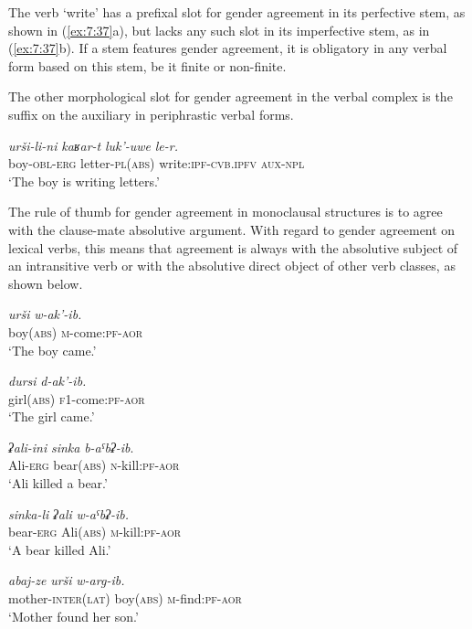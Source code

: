 ﻿\documentclass[output=paper]{langsci/langscibook}
\begin{document}
The verb `write' has a prefixal slot for gender agreement in its
perfective stem, as shown in (\ref{ex:7:37}a), but lacks any such slot in its
imperfective stem, as in (\ref{ex:7:37}b). If a stem features gender agreement, it
is obligatory in any verbal form based on this stem, be it finite or
non-finite.

The other morphological slot for gender agreement in the verbal complex
is the suffix on the auxiliary in periphrastic verbal forms.

\ea %
\gll \emph{urši-li-ni} \emph{kaʁar-t} \emph{luk'-uwe} \emph{le-r.}\\
boy-\textsc{obl}-\textsc{erg} letter-\textsc{pl}(\textsc{abs}) write:\textsc{ipf}-\textsc{cvb.ipfv} \textsc{aux}-\textsc{npl}\\
\glt `The boy is writing letters.'
\z
 
The rule of thumb for gender agreement in monoclausal structures is to
agree with the clause-mate absolutive argument. With regard to gender
agreement on lexical verbs, this means that agreement is always with the
absolutive subject of an intransitive verb or with the absolutive direct
object of other verb classes,
as shown below.

\ea %
\ea %
\gll \emph{urši} \emph{w-ak'-ib.}\\
boy(\textsc{abs}) \textsc{m}-come:\textsc{pf}-\textsc{aor}\\
\glt `The boy came.'

\ex %
\gll \emph{dursi} \emph{d-ak'-ib.}\\
girl(\textsc{abs}) \textsc{f1}-come:\textsc{pf}-\textsc{aor}\\
\glt `The girl came.'
\z

\ex %
\ea %
\gll \emph{ʡali-ini} \emph{sinka} \emph{b-aˤbʡ-ib}.\\
Ali-\textsc{erg} bear(\textsc{abs}) \textsc{n}-kill:\textsc{pf}-\textsc{aor}\\
\glt `Ali killed a bear.'

\ex %
\gll \emph{sinka-li} \emph{ʡali} \emph{w-aˤbʡ-ib.}\\
bear-\textsc{erg} Ali(\textsc{abs}) \textsc{m}-kill:\textsc{pf}-\textsc{aor}\\
\glt `A bear killed Ali.'
\z

\ex %
\ea %
\gll \emph{abaj-ze} \emph{urši} \emph{w-arg-ib.}\\
mother-\textsc{inter(lat)} boy(\textsc{abs}) \textsc{m}-find:\textsc{pf}-\textsc{aor}\\
\glt `Mother found her son.'
\end{document}

